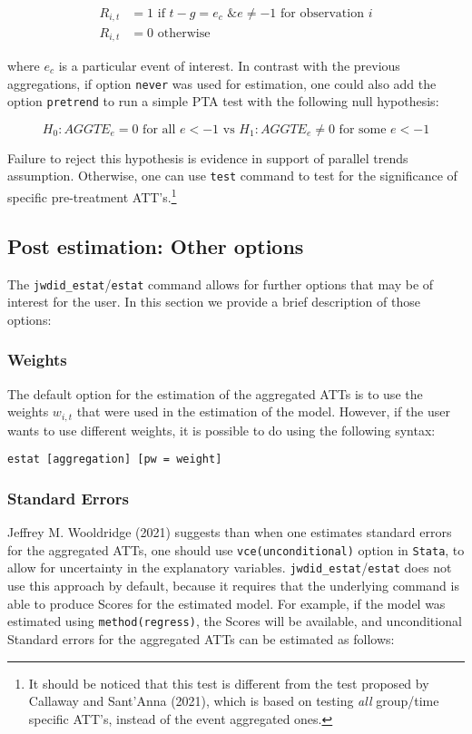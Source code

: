 \documentclass[
  letterpaper,
  DIV=11,
  numbers=noendperiod]{scrartcl}
\begin{document}
\[\begin{aligned}
R_{i,t} &= 1 \text{ if } t-g = e_c \text{ \& } e \neq -1 \text{ for observation } i \\
R_{i,t} &= 0 \text{ otherwise}
\end{aligned}
\]

where \(e_c\) is a particular event of interest. In contrast with the
previous aggregations, if option \texttt{never} was used for estimation,
one could also add the option \texttt{pretrend} to run a simple PTA test
with the following null hypothesis:

\[H_0: AGGTE_e = 0 \text{ for all } e < -1 \text{ vs }H_1: AGGTE_e \neq 0 \text{ for some } e < -1\]

Failure to reject this hypothesis is evidence in support of parallel
trends assumption. Otherwise, one can use \texttt{test} command to test
for the significance of specific pre-treatment ATT's.\footnote{It should
  be noticed that this test is different from the test proposed by
  Callaway and Sant'Anna (2021), which is based on testing \emph{all}
  group/time specific ATT's, instead of the event aggregated ones.}

\subsection{Post estimation: Other
options}\label{post-estimation-other-options}

The \texttt{jwdid\_estat}/\texttt{estat} command allows for further
options that may be of interest for the user. In this section we provide
a brief description of those options:

\subsubsection{Weights}\label{weights}

The default option for the estimation of the aggregated ATTs is to use
the weights \(w_{i,t}\) that were used in the estimation of the model.
However, if the user wants to use different weights, it is possible to
do using the following syntax:

\texttt{estat\ {[}aggregation{]}\ {[}pw\ =\ weight{]}}

\subsubsection{Standard Errors}\label{standard-errors}

Jeffrey M. Wooldridge (2021) suggests than when one estimates standard
errors for the aggregated ATTs, one should use
\texttt{vce(unconditional)} option in \texttt{Stata}, to allow for
uncertainty in the explanatory variables.
\texttt{jwdid\_estat}/\texttt{estat} does not use this approach by
default, because it requires that the underlying command is able to
produce Scores for the estimated model. For example, if the model was
estimated using \texttt{method(regress)}, the Scores will be available,
and unconditional Standard errors for the aggregated ATTs can be
estimated as follows:
\end{document}
